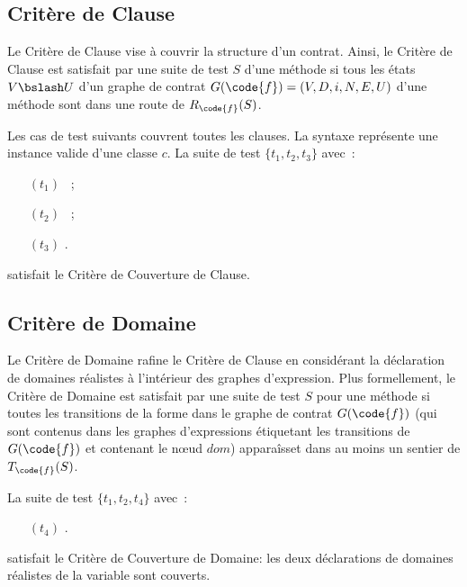 \subsection{Critère de Clause}

Le Critère de Clause vise à couvrir la structure d'un contrat. Ainsi, le Critère
de Clause est satisfait par une suite de test $S$ d'une méthode  si tous
les états $V \bslash U$ d'un graphe de contrat $G(\code{f}) = (V, D, i, N, E,
U)$ d'une méthode  sont dans une route de $R_\code{f}(S)$.

\begin{example}

Les cas de test suivants couvrent toutes les clauses. La syntaxe
 représente une instance valide d'une classe $c$. La suite
de test $\{t_1, t_2, t_3\}$ avec~:
%
\begin{itemize}

\item[$(t_1)$] ~;

\item[$(t_2)$] ~;

\item[$(t_3)$] .

\end{itemize}
%
satisfait le Critère de Couverture de Clause.

\end{example}

\subsection{Critère de Domaine}

Le Critère de Domaine rafine le Critère de Clause en considérant la déclaration
de domaines réalistes à l'intérieur des graphes d'expression. Plus formellement,
le Critère de Domaine est satisfait par une suite de test $S$ pour une méthode
 si toutes les transitions de la forme  dans le graphe de
contrat $G(\code{f})$ (qui sont contenus dans les graphes d'expressions
étiquetant les transitions de $G(\code{f})$ et contenant le nœud $\mathit{dom}$)
apparaîsset dans au moins un sentier de $T_\code{f}(S)$.

\begin{example}

La suite de test $\{t_1, t_2, t_4\}$ avec~:
%
\begin{itemize}

\item[$(t_4)$] .

\end{itemize}
%
satisfait le Critère de Couverture de Domaine: les deux déclarations de domaines
réalistes de la variable  sont couverts.

\end{example}

